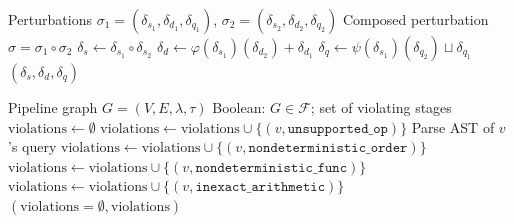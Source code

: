 \documentclass[11pt,a4paper]{article}
\theoremstyle{definition}
\newcommand{\FragF}{\mathcal{F}}
\begin{document}
\begin{algorithm}[htbp]
\caption{\textsc{Compose}: Compound Perturbation Composition}
\label{alg:compose}
\begin{algorithmic}[1]
\Require Perturbations $\sigma_1 = (\delta_{s_1}, \delta_{d_1}, \delta_{q_1})$,
  $\sigma_2 = (\delta_{s_2}, \delta_{d_2}, \delta_{q_2})$
\Ensure Composed perturbation $\sigma = \sigma_1 \circ \sigma_2$
\State $\delta_s \gets \delta_{s_1} \circ \delta_{s_2}$
\State $\delta_d \gets \varphi(\delta_{s_1})(\delta_{d_2}) + \delta_{d_1}$
\State $\delta_q \gets \psi(\delta_{s_1})(\delta_{q_2}) \sqcup \delta_{q_1}$
\State \Return $(\delta_s, \delta_d, \delta_q)$
\end{algorithmic}
\end{algorithm}

\begin{algorithm}[htbp]
\caption{\textsc{Verify-Fragment}: Fragment $\FragF$ Membership Testing}
\label{alg:verify-fragment}
\begin{algorithmic}[1]
\Require Pipeline graph $G = (V, E, \lambda, \tau)$
\Ensure Boolean: $G \in \FragF$; set of violating stages
\State $\mathrm{violations} \gets \emptyset$
    \State $\mathrm{violations} \gets \mathrm{violations} \cup \{(v, \texttt{unsupported\_op})\}$
  \EndIf
  \State Parse AST of $v$'s query
    \State $\mathrm{violations} \gets \mathrm{violations} \cup \{(v, \texttt{nondeterministic\_order})\}$
  \EndIf
    \State $\mathrm{violations} \gets \mathrm{violations} \cup \{(v, \texttt{nondeterministic\_func})\}$
  \EndIf
    \State $\mathrm{violations} \gets \mathrm{violations} \cup \{(v, \texttt{inexact\_arithmetic})\}$
  \EndIf
\EndFor
\State \Return $(\mathrm{violations} = \emptyset, \mathrm{violations})$
\end{algorithmic}
\end{algorithm}
\end{document}

